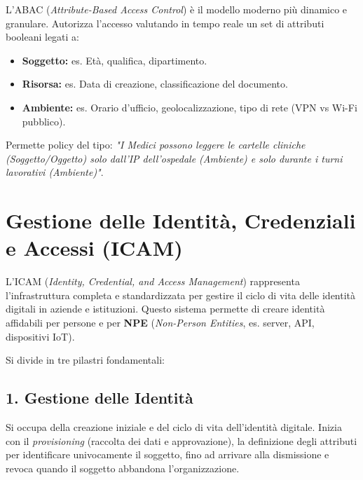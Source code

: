 \begin{defbox}
L'ABAC (\textit{Attribute-Based Access Control}) è il modello moderno più dinamico e granulare. Autorizza l'accesso valutando in tempo reale un set di attributi booleani legati a:
\begin{itemize}
    \item \textbf{Soggetto:} es. Età, qualifica, dipartimento.
    \item \textbf{Risorsa:} es. Data di creazione, classificazione del documento.
    \item \textbf{Ambiente:} es. Orario d'ufficio, geolocalizzazione, tipo di rete (VPN vs Wi-Fi pubblico).
\end{itemize}
Permette policy del tipo: \textit{"I Medici possono leggere le cartelle cliniche (Soggetto/Oggetto) solo dall'IP dell'ospedale (Ambiente) e solo durante i turni lavorativi (Ambiente)"}.
\end{defbox}


\section{Gestione delle Identità, Credenziali e Accessi (ICAM)}

L'ICAM (\textit{Identity, Credential, and Access Management}) rappresenta l'infrastruttura completa e standardizzata per gestire il ciclo di vita delle identità digitali in aziende e istituzioni.
Questo sistema permette di creare identità affidabili per persone e per \textbf{NPE} (\textit{Non-Person Entities}, es. server, API, dispositivi IoT).

Si divide in tre pilastri fondamentali:

\subsection{1. Gestione delle Identità}
Si occupa della creazione iniziale e del ciclo di vita dell'identità digitale. Inizia con il \textit{provisioning} (raccolta dei dati e approvazione), la definizione degli attributi per identificare univocamente il soggetto, fino ad arrivare alla dismissione e revoca quando il soggetto abbandona l'organizzazione.

